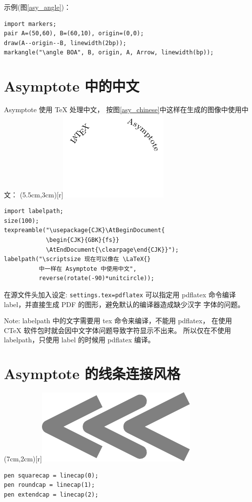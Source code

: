 \documentclass[a4paper,11pt]{article}
\begin{document}
示例(图\ref{asy_angle})：
\begin{Verbatim}
import markers;
pair A=(50,60), B=(60,10), origin=(0,0);
draw(A--origin--B, linewidth(2bp));
markangle("\angle BOA", B, origin, A, Arrow, linewidth(bp));
\end{Verbatim}

\section{Asymptote 中的中文}
Asymptote 使用 \TeX{} 处理中文，
按图\ref{asy_chinese}中这样在生成的图像中使用中文：
\parpic(5.5cm,3cm)[r]{\includegraphics{./figs/chinese.pdf}}
\begin{Verbatim}
import labelpath;
size(100);
texpreamble("\usepackage{CJK}\AtBeginDocument{
            \begin{CJK}{GBK}{fs}}
            \AtEndDocument{\clearpage\end{CJK}}");
labelpath("\scriptsize 现在可以像在 \LaTeX{}
          中一样在 Asymptote 中使用中文",
          reverse(rotate(-90)*unitcircle));
\end{Verbatim}

在源文件头加入设定: \verb+settings.tex=pdflatex+ 可以指定用 pdflatex
命令编译 label，并直接生成 PDF 的图形，避免默认的编译器造成缺少汉字%
字体的问题。

Note: labelpath 中的文字需要用 tex 命令来编译，不能用 pdflatex，
在使用 CTeX 软件包时就会因中文字体问题导致字符显示不出来。
所以仅在不使用 labelpath，只使用 label 的时候用 pdflatex 编译。

\section{Asymptote 的线条连接风格}
\parpic(7cm,2cm)[r]{\includegraphics{./figs/connection_style.pdf}}
\begin{Verbatim}
pen squarecap = linecap(0);
pen roundcap = linecap(1);
pen extendcap = linecap(2);
\end{Verbatim}
\end{document}
